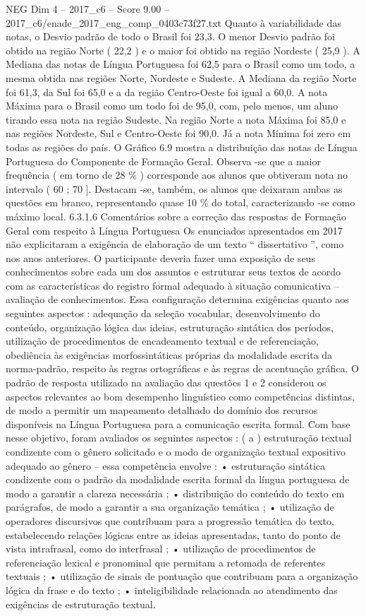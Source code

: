 \begin{textsample}{NEG Dim 4 – 2017\_c6 – Score 9.00 – 2017\_c6/enade\_2017\_eng\_comp\_0403c73f27.txt}
Quanto à variabilidade das notas, o Desvio padrão de todo o Brasil foi 23,3.
O menor Desvio padrão foi obtido na região Norte ( 22,2 ) e o maior foi obtido na região Nordeste ( 25,9 ).
A Mediana das notas de Língua Portuguesa foi 62,5 para o Brasil como um todo, a mesma obtida nas regiões Norte, Nordeste e Sudeste.
A Mediana da região Norte foi 61,3, da Sul foi 65,0 e a da região Centro-Oeste foi igual a 60,0.
A nota Máxima para o Brasil como um todo foi de 95,0, com, pelo menos, um aluno tirando essa nota na região Sudeste.
Na região Norte a nota Máxima foi 85,0 e nas regiões Nordeste, Sul e Centro-Oeste foi 90,0.
Já a nota Mínima foi zero em todas as regiões do país.
O Gráfico 6.9 mostra a distribuição das notas de Língua Portuguesa do Componente de Formação Geral.
Observa -se que a maior frequência ( em torno de 28 \% ) corresponde aos alunos que obtiveram nota no intervalo ( 60 ; 70 ].
Destacam -se, também, os alunos que deixaram ambas as questões em branco, representando quase 10 \% do total, caracterizando -se como máximo local. 6.3.1.6 Comentários sobre a correção das respostas de Formação Geral com respeito à Língua Portuguesa Os enunciados apresentados em 2017 não explicitaram a exigência de elaboração de um texto “ dissertativo ”, como nos anos anteriores.
O participante deveria fazer uma exposição de seus conhecimentos sobre cada um dos assuntos e estruturar seus textos de acordo com as características do registro formal adequado à situação comunicativa – avaliação de conhecimentos.
Essa configuração determina exigências quanto aos seguintes aspectos : adequação da seleção vocabular, desenvolvimento do conteúdo, organização lógica das ideias, estruturação sintática dos períodos, utilização de procedimentos de encadeamento textual e de referenciação, obediência às exigências morfossintáticas próprias da modalidade escrita da norma-padrão, respeito às regras ortográficas e às regras de acentuação gráfica.
O padrão de resposta utilizado na avaliação das questões 1 e 2 considerou os aspectos relevantes ao bom desempenho linguístico como competências distintas, de modo a permitir um mapeamento detalhado do domínio dos recursos disponíveis na Língua Portuguesa para a comunicação escrita formal.
Com base nesse objetivo, foram avaliados os seguintes aspectos : ( a ) estruturação textual condizente com o gênero solicitado e o modo de organização textual expositivo adequado ao gênero – essa competência envolve : • estruturação sintática condizente com o padrão da modalidade escrita formal da língua portuguesa de modo a garantir a clareza necessária ; • distribuição do conteúdo do texto em parágrafos, de modo a garantir a sua organização temática ; • utilização de operadores discursivos que contribuam para a progressão temática do texto, estabelecendo relações lógicas entre as ideias apresentadas, tanto do ponto de vista intrafrasal, como do interfrasal ; • utilização de procedimentos de referenciação lexical e pronominal que permitam a retomada de referentes textuais ; • utilização de sinais de pontuação que contribuam para a organização lógica da frase e do texto ; • inteligibilidade relacionada ao atendimento das exigências de estruturação textual.

\end{textsample}
